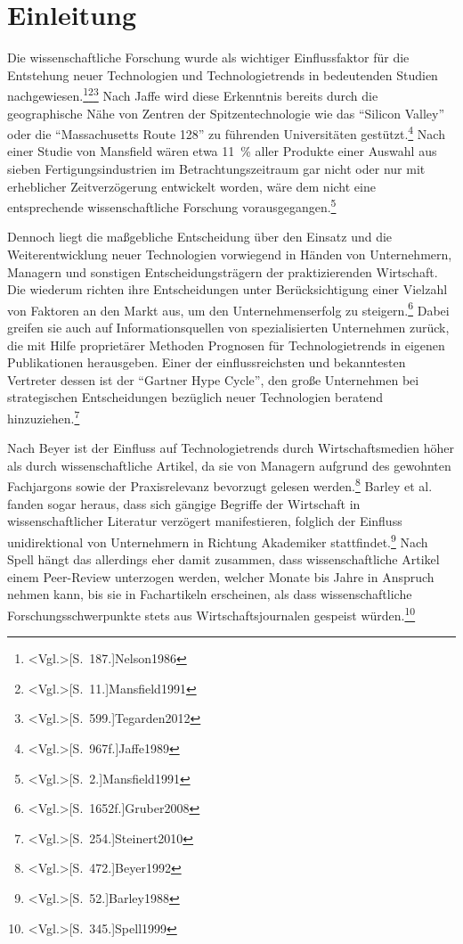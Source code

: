 \section{Einleitung}
Die wissenschaftliche Forschung wurde als wichtiger Einflussfaktor für die Entstehung neuer Technologien und Technologietrends in bedeutenden Studien nachgewiesen.\footnote{\citeNP<Vgl.>[S.~187.]{Nelson1986}}\footnote{\citeNP<Vgl.>[S.~11.]{Mansfield1991}}\footnote{\citeNP<Vgl.>[S.~599.]{Tegarden2012}}
Nach Jaffe wird diese Erkenntnis bereits durch die geographische Nähe von Zentren der Spitzentechnologie wie das "`Silicon Valley"' oder die "`Massachusetts Route 128"' zu führenden Universitäten gestützt.\footnote{\citeNP<Vgl.>[S.~967f.]{Jaffe1989}} Nach einer Studie von Mansfield wären etwa 11~\% aller Produkte einer Auswahl aus sieben Fertigungsindustrien im Betrachtungszeitraum gar nicht oder nur mit erheblicher Zeitverzögerung entwickelt worden, wäre dem nicht eine entsprechende wissenschaftliche Forschung vorausgegangen.\footnote{\citeNP<Vgl.>[S.~2.]{Mansfield1991}}

Dennoch liegt die maßgebliche Entscheidung über den Einsatz und die Weiterentwicklung neuer Technologien vorwiegend in Händen von Unternehmern, Managern und sonstigen Entscheidungsträgern der praktizierenden Wirtschaft. Die wiederum richten ihre Entscheidungen unter Berücksichtigung einer Vielzahl von Faktoren an den Markt aus, um den Unternehmenserfolg zu steigern.\footnote{\citeNP<Vgl.>[S.~1652f.]{Gruber2008}} Dabei greifen sie auch auf Informationsquellen von spezialisierten Unternehmen zurück, die mit Hilfe proprietärer Methoden Prognosen für Technologietrends in eigenen Publikationen herausgeben. Einer der einflussreichsten und bekanntesten Vertreter dessen ist der "`Gartner Hype Cycle"', den große Unternehmen bei strategischen Entscheidungen bezüglich neuer Technologien beratend hinzuziehen.\footnote{\citeNP<Vgl.>[S.~254.]{Steinert2010}}

Nach Beyer ist der Einfluss auf Technologietrends durch Wirtschaftsmedien höher als durch wissenschaftliche Artikel, da sie von Managern aufgrund des gewohnten Fachjargons sowie der Praxisrelevanz bevorzugt gelesen werden.\footnote{\citeNP<Vgl.>[S.~472.]{Beyer1992}} Barley et al. fanden sogar heraus, dass sich gängige Begriffe der Wirtschaft in wissenschaftlicher Literatur verzögert manifestieren, folglich der Einfluss unidirektional von Unternehmern in Richtung Akademiker stattfindet.\footnote{\citeNP<Vgl.>[S.~52.]{Barley1988}} Nach Spell hängt das allerdings eher damit zusammen, dass wissenschaftliche Artikel einem Peer-Review unterzogen werden, welcher Monate bis Jahre in Anspruch nehmen kann, bis sie in Fachartikeln erscheinen, als dass wissenschaftliche Forschungsschwerpunkte stets aus Wirtschaftsjournalen gespeist würden.\footnote{\citeNP<Vgl.>[S.~345.]{Spell1999}}

